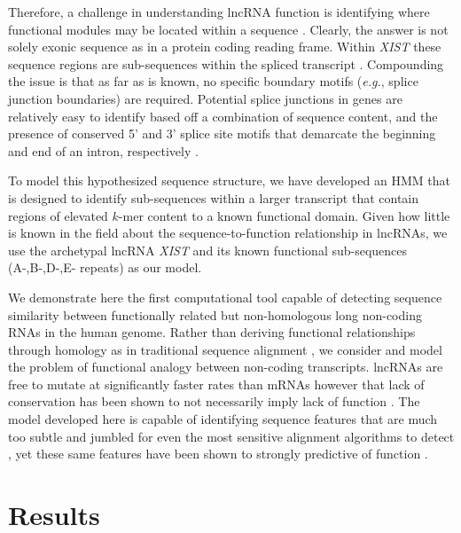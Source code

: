 Therefore, a challenge in understanding lncRNA function is identifying where functional modules may be located within a sequence \cite{Pang2006RapidFunction,Hezroni2015PrinciplesSpecies,Johnson2014TheRNAs}. Clearly, the answer is not solely exonic sequence as in a protein coding reading frame. Within \emph{XIST} these sequence regions are sub-sequences within the spliced transcript \cite{Brockdorff10TheNucleus.,Brown10TheNucleus.,Brockdorff2018LocalNcRNA,Sprague2019NonlinearDomains,Pintacuda2017HnRNPKSilencing,Hoki2009AMouse,Sunwoo2017RepeatCIZ1}. Compounding the issue is that as far as is known, no specific boundary motifs (\emph{e.g.}, splice junction boundaries) are required. Potential splice junctions in genes are relatively easy to identify based off a combination of sequence content, and the presence of conserved 5' and 3' splice site motifs that demarcate the beginning and end of an intron, respectively \cite{Burge1997PredictionDNA}. 

To model this hypothesized sequence structure, we have developed an HMM that is designed to identify sub-sequences within a larger transcript that contain regions of elevated $k$-mer content to a known functional domain. Given how little is known in the field about the sequence-to-function relationship in lncRNAs, we use the archetypal lncRNA \emph{XIST} and its known functional sub-sequences (A-,B-,D-,E- repeats) as our model. 

We demonstrate here the first computational tool capable of detecting sequence similarity between functionally related but non-homologous  long non-coding RNAs in the human genome. Rather than deriving functional relationships through homology as in traditional sequence alignment \cite{Altschul1990BasicTool,Wheeler2013Nhmmer:HMMs}, we consider and model the problem of functional analogy between non-coding transcripts. lncRNAs are free to mutate at significantly faster rates than mRNAs however that lack of conservation has been shown to not necessarily imply lack of function \cite{Johnsson2014EvolutionaryFunction,Sprague2019NonlinearDomains,Nesterova2001CharacterizationSequence}. The model developed here is capable of identifying sequence features that are much too subtle and jumbled for even the most sensitive alignment algorithms to detect \cite{Wheeler2013Nhmmer:HMMs,Altschul1990BasicTool,Rice2000EMBOSS:Suite}, yet these same features have been shown to strongly predictive of function \cite{Kirk2018FunctionalContent,Sprague2019NonlinearDomains}. 

\section{Results}
